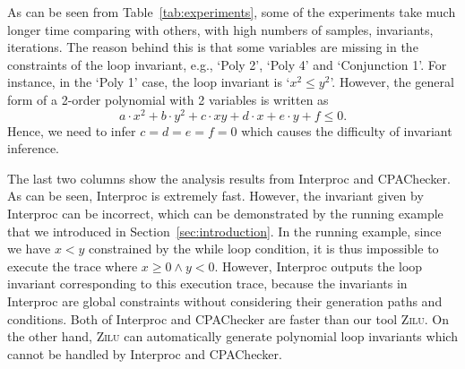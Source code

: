 As can be seen from Table~\ref{tab:experiments}, 
some of the experiments take much longer time comparing with others, 
with high numbers of samples, invariants, iterations. 
The reason behind this is 
that some variables are missing in the constraints of the loop invariant, 
e.g., `Poly 2', `Poly 4' and `Conjunction 1'.  
For instance, in the `Poly 1' case, the loop invariant is `$x^2 \le y^2$'. 
However, the general form of a 2-order polynomial with 2 variables 
is written as 
\[
    a \cdot x^2 + b \cdot y^2 + c \cdot x y + d \cdot x + e \cdot y + f \le 0. 
\] 
Hence, we need to infer $c = d = e = f = 0$ 
which causes the difficulty of invariant inference. 

The last two columns show the analysis results from Interproc and CPAChecker. 
As can be seen, Interproc is extremely fast. 
However, the invariant given by Interproc can be incorrect, 
which can be demonstrated by the running example 
that we introduced in Section~\ref{sec:introduction}. 
In the running example, since we have $x < y$ constrained by the while loop condition, 
it is thus impossible to execute the trace where $x \ge 0 \land y < 0$. 
However, Interproc outputs the loop invariant corresponding to this execution trace, 
because the invariants in Interproc are global constraints 
without considering their generation paths and conditions. 
Both of Interproc and CPAChecker are faster than our tool \textsc{Zilu}. 
On the other hand, \textsc{Zilu} can automatically generate polynomial loop invariants 
which cannot be handled by Interproc and CPAChecker. 

